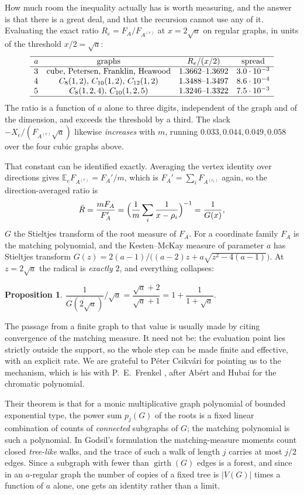 \documentclass[11pt]{article}
\newtheorem{proposition}[theorem]{Proposition}
\theoremstyle{remark}
\begin{document}
How much room the inequality actually has is worth measuring, and the answer is that
there is a great deal, and that the recursion cannot use any of it. Evaluating the
exact ratio $R_e=F_A/F_{A^{(e)}}$ at $x=2\sqrt a$ on regular graphs, in units of the
threshold $x/2=\sqrt a$:
\[
\begin{array}{lccc}
\hline
a & \text{graphs} & R_e/(x/2) & \text{spread}\\
\hline
3 & \text{cube, Petersen, Franklin, Heawood} & 1.3662\text{--}1.3692 & 3.0\cdot10^{-3}\\
4 & C_8(1,2),\,C_{10}(1,2),\,C_{12}(1,2) & 1.3488\text{--}1.3497 & 8.6\cdot10^{-4}\\
5 & C_8(1,2,4),\,C_{10}(1,2,5) & 1.3246\text{--}1.3322 & 7.5\cdot10^{-3}\\
\hline
\end{array}
\]
The ratio is a function of $a$ alone to three digits, independent of the graph and of the
dimension, and exceeds the threshold by a third. The slack $-X_e/(F_{A^{(e)}}\sqrt a)$
likewise \emph{increases} with $m$, running $0.033,0.044,0.049,0.058$ over the four cubic
graphs above.

That constant can be identified exactly. Averaging the vertex identity over directions
gives $\mathbb E_eF_{A^{(e)}}=F_A'/m$, which is $F_A'=\sum_iF_{A^{(e_i)}}$ again, so
the direction-averaged ratio is
\[
\bar R=\frac{mF_A}{F_A'}=\Bigl(\frac1m\sum_i\frac1{x-\rho_i}\Bigr)^{-1}=\frac1{G(x)},
\]
$G$ the Stieltjes transform of the root measure of $F_A$. For a coordinate family $F_A$ is
the matching polynomial, and the Kesten--McKay measure of parameter $a$ has Stieltjes
transform $G(z)=2(a-1)/\bigl((a-2)z+a\sqrt{z^2-4(a-1)}\bigr)$. At $z=2\sqrt a$ the radical
is \emph{exactly} $2$, and everything collapses:

\begin{proposition}\label{prop:km}
$\dfrac{1}{G(2\sqrt a)}\Big/\sqrt a=\dfrac{\sqrt a+2}{\sqrt a+1}=1+\dfrac1{1+\sqrt a}$.
\end{proposition}

The passage from a finite graph to that value is usually made by citing convergence of the
matching measure. It need not be: the evaluation point lies strictly outside the support,
so the whole step can be made finite and effective, with an explicit rate. We are grateful
to P\'eter Csikv\'ari for pointing us to the mechanism, which is his with P.\ E.\ Frenkel
\cite{CsF}, after Ab\'ert and Hubai for the chromatic polynomial.

Their theorem is that for a monic multiplicative graph polynomial of bounded exponential
type, the power sum $p_j(G)$ of the roots is a fixed linear combination of counts of
\emph{connected} subgraphs of $G$; the matching polynomial is such a polynomial. In
Godsil's formulation \cite{Go} the matching-measure moments count closed \emph{tree-like}
walks, and the trace of such a walk of length $j$ carries at most $j/2$ edges. Since a
subgraph with fewer than $\operatorname{girth}(G)$ edges is a forest, and since in an
$a$-regular graph the number of copies of a fixed tree is $|V(G)|$ times a function of $a$
alone, one gets an identity rather than a limit.
\end{document}
